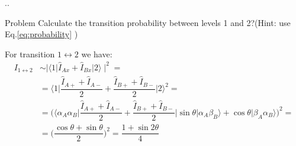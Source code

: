 \documentclass[handout]{beamer}
\begin{document}
\begin{frame}{\thesection.\thesubsection. \insertsubsection}
  \begin{block}{Problem}
     Calculate the transition probability between levels 1 and 2?(Hint: use Eq.\ref{eq:probability} )
  \end{block}	    	
  For transition $1 \leftrightarrow 2$ we have:
  \begin{equation}
  \begin{split}
      I_{1 \leftrightarrow 2} &\sim \mid \langle 1 \vert \hat{I}_{Ax} + \hat{I}_{Bx} \vert 2 \rangle  \mid^2 = \\
      &= \langle 1 \vert \dfrac{\hat{I}_{A+} + \hat{I}_{A-}}{2}  + \dfrac{\hat{I}_{B+} + \hat{I}_{B-}}{2}   \vert 2 \rangle ^2 =\\
      &= \Big( \langle \alpha_A  \alpha_B  \vert \dfrac{\hat{I}_{A+} + \hat{I}_{A-}}{2}  + \dfrac{\hat{I}_{B+} + \hat{I}_{B-}}{2}   \vert  \sin \theta \vert \alpha_A \beta_B  \rangle + \cos \theta \vert  \beta_A \alpha_B  \rangle  \Big) ^2 =\\
      &= \Big( \dfrac{\cos \theta + \sin \theta}{2}    \Big)^2 = \dfrac{1 + \sin 2\theta}{4}
  \end{split}
  \end{equation}
\end{frame}
\end{document}
